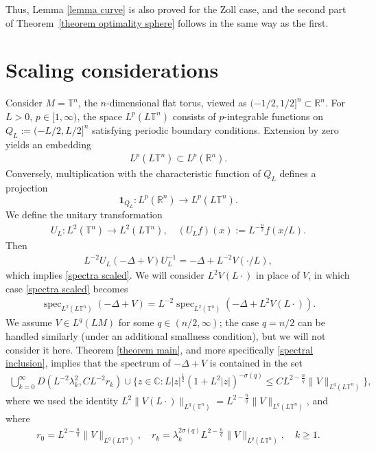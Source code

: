\documentclass[12pt]{amsart}
\newcommand{\R}{{\mathbb R}}
\newcommand{\C}{{\mathbb C}}
\DeclareMathOperator{\spec}{spec}
\begin{document}
 Thus, Lemma \ref{lemma curve} is also proved for the Zoll case, and the second part of Theorem~\ref{theorem optimality sphere} follows in the same way as the first.


\section{Scaling considerations}\label{Section Scaling considerations}
Consider $M=\mathbb{T}^n$, the $n$-dimensional flat torus, viewed as $(-1/2,1/2]^n\subset\R^n$. For $L>0$, $p\in [1,\infty)$, the space $L^p(L\mathbb{T}^n)$ consists of $p$-integrable functions on $Q_L:=(-L/2,L/2]^n$ satisfying periodic boundary conditions. Extension by zero yields an embedding 
\begin{align}\label{torus embedding}
    L^p(L\mathbb{T}^n)\subset L^p(\R^n).
 \end{align}   
Conversely, multiplication with the characteristic function of $Q_L$ defines a projection $$\mathbf{1}_{Q_L}:L^p(\R^n)\to L^p(L\mathbb{T}^n).$$
We define the unitary transformation
\begin{align}
    U_L:L^2(\mathbb{T}^n)\to L^2(L\mathbb{T}^n),\quad (U_Lf)(x):=L^{-\frac{n}{2}}f(x/L).
\end{align}
Then
\begin{align}
    L^{-2}U_L(-\Delta+V)U_L^{-1}=
    -\Delta+L^{-2}V(\cdot/L),
\end{align}
which implies \eqref{spectra scaled}. We will consider $L^2V(L\cdot)$ in place of $V$, in which case \eqref{spectra scaled} becomes
\begin{align}\label{spectra scaled 2}
    \spec_{L^2(L\mathbb{T}^n)}(-\Delta+V)=L^{-2}\spec_{L^2(\mathbb{T}^n)}(-\Delta+L^2V(L\cdot)).
\end{align} 
We assume $V\in L^q(LM)$ for some $q\in(n/2,\infty)$; the case $q=n/2$ can be handled similarly (under an additional smallness condition), but we will not consider it here. Theorem \ref{theorem main}, and more specifically \eqref{spectral inclusion}, implies that the spectrum of $-\Delta+V$ is contained in the set
\begin{align}\label{spectral inclusion scaled}
\bigcup_{k=0}^{\infty}D(L^{-2}\lambda_k^2,CL^{-2}r_k)\cup \{z\in\C: L|z|^{\frac{1}{2}}(1+L^2|z|)^{-\sigma(q)}\leq C L^{2-\frac{n}{q}}\|V\|_{L^q(L\mathbb{T}^n)}\},
\end{align}
where we used the identity $L^2\|V(L\cdot)\|_{L^q(\mathbb{T}^n)}=L^{2-\frac{n}{q}}\|V\|_{L^q(L\mathbb{T}^n)}$, and where 
\begin{align}
    r_0=L^{2-\frac{n}{q}}\|V\|_{L^q(L\mathbb{T}^n)},\quad r_k=\lambda_k^{2\sigma(q)}L^{2-\frac{n}{q}}\|V\|_{L^q(L\mathbb{T}^n)},\quad k\geq 1.
\end{align}
\end{document}
